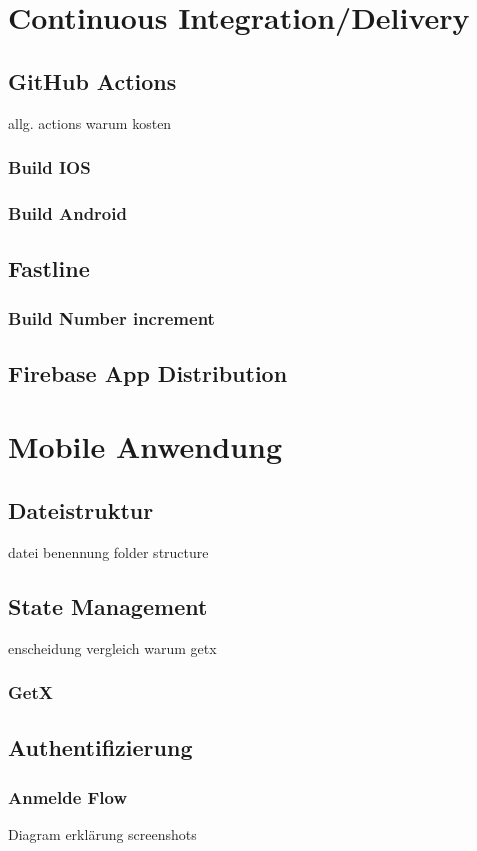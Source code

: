 \section{Continuous Integration/Delivery}
\subsection{GitHub Actions}
allg. actions warum kosten
\subsubsection{Build IOS}
\subsubsection{Build Android}

\subsection{Fastline}
\subsubsection{Build Number increment}
\subsection{Firebase App Distribution}

\section{Mobile Anwendung}
\subsection{Dateistruktur}
datei benennung folder structure
\subsection{State Management}
enscheidung vergleich warum getx
\subsubsection{GetX}

\subsection{Authentifizierung}
\subsubsection{Anmelde Flow}
Diagram
erklärung
screenshots

